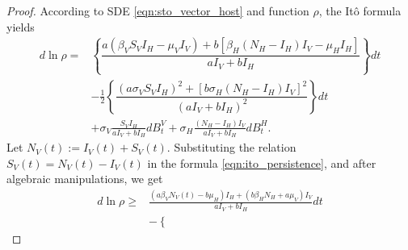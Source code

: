 \begin{proof}
    According to SDE \eqref{eqn:sto_vector_host} and function $\rho$,
    the It\^{o} formula yields
    \begin{equation} \label{eqn:ito_persistence} 
        \begin{aligned}
          d \ln \rho =&
            \left \{
                \dfrac{
                    a (\beta_V S_V I_H - \mu_V I_V)
                    +
                    b [\beta_H (N_H - I_H) I_V - \mu_H I_H]
                }{a I_V + bI_H}
            \right \} dt
            \\
            & -
            \frac{1}{2}
            \left \{
                \dfrac{
                    \left(
                        a \sigma_V S_V I_H
                    \right) ^ 2
                    +
                    \left[
                        b \sigma_H (N_H - I_H) I_V
                    \right] ^2
                }{
                    \left( 
                        a I_V + bI_H
                    \right) ^ 2
                }
            \right \} dt
            \\
            & +
            \sigma_V 
            \frac{S_V I_H}{a I_V + b I_H}
            d B_t ^ V
            +
            \sigma_H 
            \frac{(N_H - I_H) I_V}{a I_V + b I_H}
            d B_t ^ H .
        \end{aligned}
    \end{equation}
    Let $N_V(t):= I_V(t) + S_V(t)$. Substituting the relation
    $S_V(t)= N_V(t) - I_V(t)$ in the formula \eqref{eqn:ito_persistence}, %
    and after algebraic manipulations, we get
    \begin{equation} \label{eqn:ito_bound_1}
        \begin{aligned}
            d \ln \rho
                \geq &
                \frac{
                    \left(
                        a \beta_V N_V(t) - b \mu_H
                    \right) I_H
                    +
                    \left(
                        b \beta_H N_H + a \mu_V
                    \right) I_V
                }{a I_V + bI_H}
                dt
                \\
                &-
                \left \{

\end{aligned}
\end{equation}
\end{proof}
